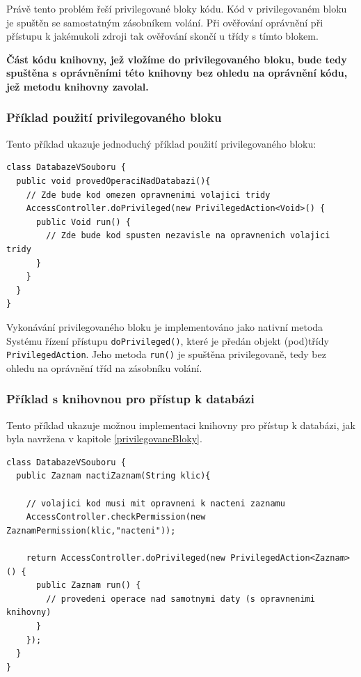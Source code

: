 Právě tento problém řeší privilegované bloky kódu. Kód v privilegovaném bloku je spuštěn se samostatným zásobníkem volání. Při ověřování oprávnění při přístupu k jakémukoli zdroji tak ověřování skončí u třídy s tímto blokem.

{\bf Část kódu knihovny, jež vložíme do privilegovaného bloku, bude tedy spuštěna s oprávněními této knihovny bez ohledu na oprávnění kódu, jež metodu knihovny zavolal.}

\subsubsection{Příklad použití privilegovaného bloku}

Tento příklad ukazuje jednoduchý příklad použití privilegovaného bloku: \cite{refAccessController}

\begin{lstlisting}[caption=Příklad použití privilegovaného bloku, label=prikladBloku]
class DatabazeVSouboru {
  public void provedOperaciNadDatabazi(){
    // Zde bude kod omezen opravnenimi volajici tridy
    AccessController.doPrivileged(new PrivilegedAction<Void>() {
      public Void run() {
        // Zde bude kod spusten nezavisle na opravnenich volajici tridy
      }
    }
  }
}
\end{lstlisting}

Vykonávání privilegovaného bloku je implementováno jako nativní metoda Systému řízení přístupu {\tt doPrivileged()}, které je předán objekt (pod)třídy {\tt PrivilegedAction}. Jeho metoda {\tt run()} je spuštěna privilegovaně, tedy bez ohledu na oprávnění tříd na zásobníku volání.

\subsubsection{Příklad s knihovnou pro přístup k databázi}\label{databazeVsouboru}

Tento příklad ukazuje možnou implementaci knihovny pro přístup k databázi, jak byla navržena v kapitole \ref{privilegovaneBloky}.

\begin{lstlisting}[caption=Demonstrační knihovna pro přístup k databázi, label=pouzitiAC]
class DatabazeVSouboru {
  public Zaznam nactiZaznam(String klic){
    
    // volajici kod musi mit opravneni k nacteni zaznamu
    AccessController.checkPermission(new ZaznamPermission(klic,"nacteni"));
    
    return AccessController.doPrivileged(new PrivilegedAction<Zaznam>() {
      public Zaznam run() {
        // provedeni operace nad samotnymi daty (s opravnenimi knihovny)
      }
    });
  }
}
\end{lstlisting}

